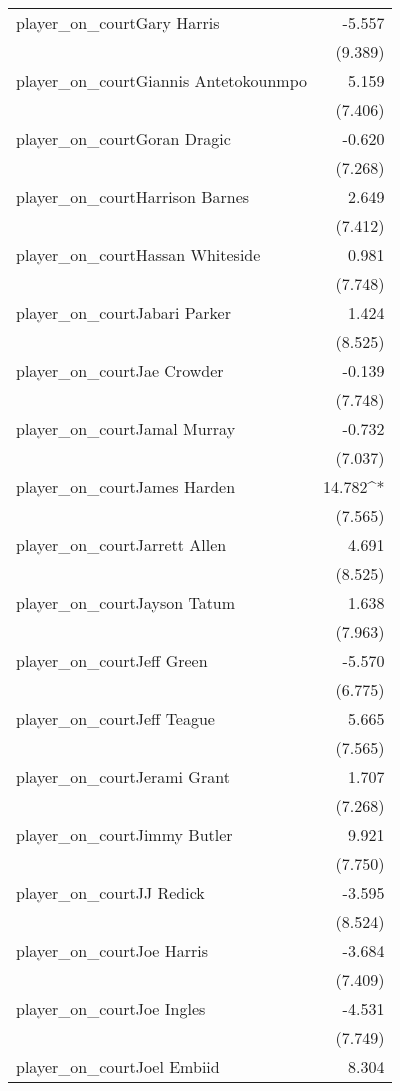 \documentclass[
  landscape]{article}
\begin{document}
\begin{table}[!htbp]
\begin{tabular}{@{\extracolsep{5pt}}lD{.}{.}{-3} }
  player\_on\_courtGary Harris & -5.557 \\ 
  & (9.389) \\ 
  player\_on\_courtGiannis Antetokounmpo & 5.159 \\ 
  & (7.406) \\ 
  player\_on\_courtGoran Dragic & -0.620 \\ 
  & (7.268) \\ 
  player\_on\_courtHarrison Barnes & 2.649 \\ 
  & (7.412) \\ 
  player\_on\_courtHassan Whiteside & 0.981 \\ 
  & (7.748) \\ 
  player\_on\_courtJabari Parker & 1.424 \\ 
  & (8.525) \\ 
  player\_on\_courtJae Crowder & -0.139 \\ 
  & (7.748) \\ 
  player\_on\_courtJamal Murray & -0.732 \\ 
  & (7.037) \\ 
  player\_on\_courtJames Harden & 14.782^{*} \\ 
  & (7.565) \\ 
  player\_on\_courtJarrett Allen & 4.691 \\ 
  & (8.525) \\ 
  player\_on\_courtJayson Tatum & 1.638 \\ 
  & (7.963) \\ 
  player\_on\_courtJeff Green & -5.570 \\ 
  & (6.775) \\ 
  player\_on\_courtJeff Teague & 5.665 \\ 
  & (7.565) \\ 
  player\_on\_courtJerami Grant & 1.707 \\ 
  & (7.268) \\ 
  player\_on\_courtJimmy Butler & 9.921 \\ 
  & (7.750) \\ 
  player\_on\_courtJJ Redick & -3.595 \\ 
  & (8.524) \\ 
  player\_on\_courtJoe Harris & -3.684 \\ 
  & (7.409) \\ 
  player\_on\_courtJoe Ingles & -4.531 \\ 
  & (7.749) \\ 
  player\_on\_courtJoel Embiid & 8.304 \\ 

\end{tabular}
\end{table}
\end{document}
